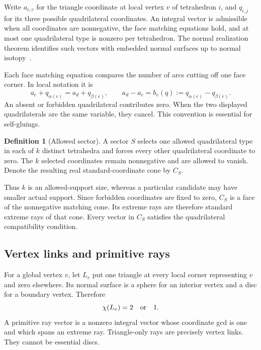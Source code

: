 \documentclass[11pt]{article}
\theoremstyle{definition}
\newtheorem{definition}[theorem]{Definition}
\theoremstyle{remark}
\begin{document}
Write $a_{i,v}$ for the triangle coordinate at local vertex $v$ of tetrahedron
$i$, and $q_{i,j}$ for its three possible quadrilateral coordinates. An integral
vector is admissible when all coordinates are nonnegative, the face matching
equations hold, and at most one quadrilateral type is nonzero per tetrahedron.
The normal realization theorem identifies such vectors with embedded normal
surfaces up to normal isotopy~\cite[Theorem 5.1]{hlp}.

Each face matching equation compares the number of arcs cutting off one face
corner. In local notation it is
\begin{equation}
 a_c+q_{\alpha(e)}=a_d+q_{\beta(e)},
 \qquad a_d-a_c=b_e(q):=q_{\alpha(e)}-q_{\beta(e)}.
 \label{eq:difference}
\end{equation}
An absent or forbidden quadrilateral contributes zero. When the two displayed
quadrilaterals are the same variable, they cancel. This convention is essential
for self-gluings.

\begin{definition}[Allowed sector]
A sector $S$ selects one allowed quadrilateral type in each of $k$ distinct
tetrahedra and forces every other quadrilateral coordinate to zero. The $k$
selected coordinates remain nonnegative and are allowed to vanish. Denote the
resulting real standard-coordinate cone by $C_S$.
\end{definition}

Thus $k$ is an allowed-support size, whereas a particular candidate may have
smaller actual support. Since forbidden coordinates are fixed to zero,
$C_S$ is a face of the nonnegative matching cone. Its extreme rays are
therefore standard extreme rays of that cone. Every vector in $C_S$ satisfies
the quadrilateral compatibility condition.

\subsection{Vertex links and primitive rays}

For a global vertex $v$, let $L_v$ put one triangle at every local corner
representing $v$ and zero elsewhere. Its normal surface is a sphere for an
interior vertex and a disc for a boundary vertex. Therefore
\begin{equation}
 \chi(L_v)=2\quad\hbox{or}\quad1.
 \label{eq:linkchi}
\end{equation}
A primitive ray vector is a nonzero integral vector whose coordinate gcd is
one and which spans an extreme ray. Triangle-only rays are precisely
vertex links. They cannot be essential discs.
\end{document}
